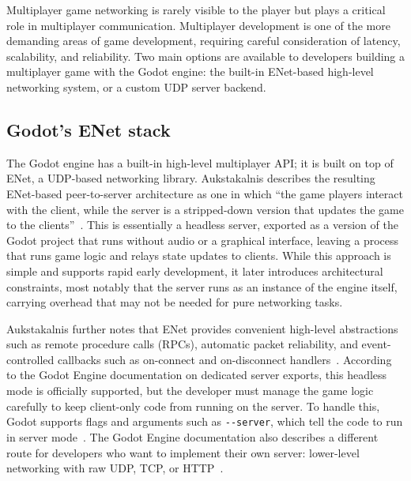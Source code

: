 \IfFileExists{IEEEtran.cls}{\ieeetrue\documentclass[conference]{IEEEtran}}{\ieeefalse\documentclass[twocolumn,10pt]{article}}
\begin{document}
%
%
Multiplayer game networking is rarely visible to the player but plays a critical role in multiplayer communication. Multiplayer development is one of the more demanding areas of game development, requiring careful consideration of latency, scalability, and reliability. Two main options are available to developers building a multiplayer game with the Godot engine: the built-in ENet-based high-level networking system, or a custom UDP server backend.

\subsection{Godot's ENet stack}
The Godot engine has a built-in high-level multiplayer API; it is built on top of ENet, a UDP-based networking library. Aukstakalnis describes the resulting ENet-based peer-to-server architecture as one in which ``the game players interact with the client, while the server is a stripped-down version that updates the game to the clients''~\cite[p.~4]{aukstakalnis2024}. This is essentially a headless server, exported as a version of the Godot project that runs without audio or a graphical interface, leaving a process that runs game logic and relays state updates to clients. While this approach is simple and supports rapid early development, it later introduces architectural constraints, most notably that the server runs as an instance of the engine itself, carrying overhead that may not be needed for pure networking tasks.

Aukstakalnis further notes that ENet provides convenient high-level abstractions such as remote procedure calls (RPCs), automatic packet reliability, and event-controlled callbacks such as on-connect and on-disconnect handlers~\cite{aukstakalnis2024}. According to the Godot Engine documentation on dedicated server exports, this headless mode is officially supported, but the developer must manage the game logic carefully to keep client-only code from running on the server. To handle this, Godot supports flags and arguments such as \texttt{-{}-server}, which tell the code to run in server mode~\cite{godotdedicated}. The Godot Engine documentation also describes a different route for developers who want to implement their own server: lower-level networking with raw UDP, TCP, or HTTP~\cite{godotudp}.
\end{document}
